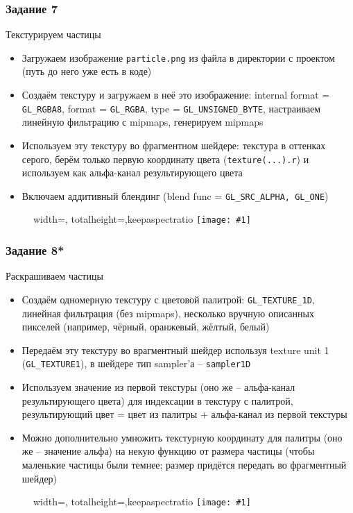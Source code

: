 \documentclass{beamer}
\newcommand{\slideimage}[1]{
  \begin{figure}
    \begin{adjustbox}{width=\textwidth, totalheight=\textheight-2\baselineskip-2\baselineskip,keepaspectratio}
      \texttt{[image: \#1]}
    \end{adjustbox}
  \end{figure}
}
\begin{document}
\begin{frame}[fragile]
\frametitle{Задание 7}
Текстурируем частицы
\begin{itemize}
\item Загружаем изображение \verb|particle.png| из файла в директории с проектом (путь до него уже есть в коде)
\item Создаём текстуру и загружаем в неё это изображение: internal format = \verb|GL_RGBA8|, format = \verb|GL_RGBA|, type = \verb|GL_UNSIGNED_BYTE|, настраиваем линейную фильтрацию с mipmaps, генерируем mipmaps
\item Используем эту текстуру во фрагментном шейдере: текстура в оттенках серого, берём только первую координату цвета (\verb|texture(...).r|) и используем как альфа-канал результирующего цвета
\item Включаем аддитивный блендинг (blend func = \verb|GL_SRC_ALPHA, GL_ONE|)
\end{itemize}
\end{frame}

\begin{frame}[fragile]
\slideimage{7.png}
\end{frame}

\begin{frame}[fragile]
\frametitle{Задание 8*}
Раскрашиваем частицы
\begin{itemize}
\item Создаём одномерную текстуру с цветовой палитрой: \verb|GL_TEXTURE_1D|, линейная фильтрация (без mipmaps), несколько вручную описанных пикселей (например, чёрный, оранжевый, жёлтый, белый)
\item Передаём эту текстуру во врагментный шейдер используя texture unit 1 (\verb|GL_TEXTURE1|), в шейдере тип sampler'а -- \verb|sampler1D|
\item Используем значение из первой текстуры (оно же -- альфа-канал результирующего цвета) для индексации в текстуру с палитрой, результирующий цвет = цвет из палитры + альфа-канал из первой текстуры
\item Можно дополнительно умножить текстурную координату для палитры (оно же -- значение альфа) на некую функцию от размера частицы (чтобы маленькие частицы были темнее; размер придётся передать во фрагментный шейдер)
\end{itemize}
\end{frame}

\begin{frame}[fragile]
\slideimage{8.png}
\end{frame}
\end{document}
